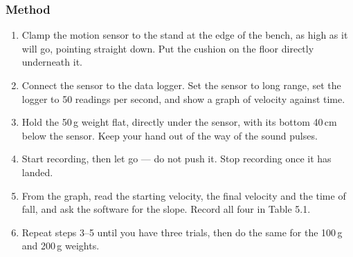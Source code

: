 \subsubsection*{Method}
\begin{enumerate}[itemsep=2pt]
  \item Clamp the motion sensor to the stand at the edge of the bench, as high as it will go, pointing straight down. Put the cushion on the floor directly underneath it.
  \item Connect the sensor to the data logger. Set the sensor to long range, set the logger to 50 readings per second, and show a graph of velocity against time.
  \item Hold the 50\,g weight flat, directly under the sensor, with its bottom 40\,cm below the sensor. Keep your hand out of the way of the sound pulses.
  \item Start recording, then let go --- do not push it. Stop recording once it has landed.
  \item From the graph, read the starting velocity, the final velocity and the time of fall, and ask the software for the slope. Record all four in Table 5.1.
  \item Repeat steps 3--5 until you have three trials, then do the same for the 100\,g and 200\,g weights.
\end{enumerate}



